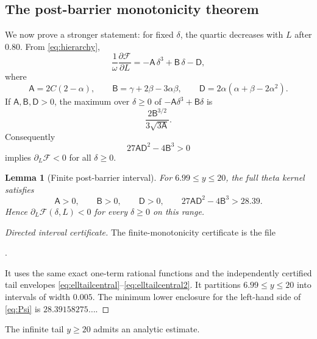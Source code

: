 \documentclass{amsart}
\numberwithin{equation}{section}
\newtheorem{lemma}[theorem]{Lemma}
\theoremstyle{definition}
\theoremstyle{remark}
\newcommand{\Fcal}{\mathcal F}
\begin{document}
\subsection{The post-barrier monotonicity theorem}
We now prove a stronger statement: for fixed $\delta$, the quartic decreases with $L$ after $0.80$.
From \eqref{eq:hierarchy},
\begin{equation}\label{eq:partialF}
 \frac1\omega\frac{\partial\Fcal}{\partial L}
 =-\mathsf A\,\delta^3+\mathsf B\,\delta-\mathsf D,
\end{equation}
where
\begin{equation}\label{eq:ABD}
 \mathsf A=2C(2-\alpha),\qquad
 \mathsf B=\gamma+2\beta-3\alpha\beta,
 \qquad
 \mathsf D=2\alpha(\alpha+\beta-2\alpha^2).
\end{equation}
If $\mathsf A,\mathsf B,\mathsf D>0$, the maximum over $\delta\ge0$ of
$-\mathsf A\delta^3+\mathsf B\delta$ is
\begin{equation}\label{eq:cubicmax}
 \frac{2\mathsf B^{3/2}}{3\sqrt{3\mathsf A}}.
\end{equation}
Consequently
\begin{equation}\label{eq:Psi}
 27\mathsf A\mathsf D^2-4\mathsf B^3>0
\end{equation}
implies $\partial_L\Fcal<0$ for all $\delta\ge0$.

\begin{lemma}[Finite post-barrier interval]\label{lem:finitepost}
For $6.99\le y\le20$, the full theta kernel satisfies
\[
 \mathsf A>0,\qquad \mathsf B>0,\qquad \mathsf D>0,
 \qquad
 27\mathsf A\mathsf D^2-4\mathsf B^3>28.39.
\]
Hence $\partial_L\Fcal(\delta,L)<0$ for every $\delta\ge0$ on this range.
\end{lemma}
\begin{proof}[Directed interval certificate]
The finite-monotonicity certificate is the file\par\smallskip\noindent{}.\par\smallskip\noindent It uses the same exact one-term rational functions and the independently certified tail envelopes \eqref{eq:elltailcentral}--\eqref{eq:elltailcentral2}.  It partitions $6.99\le y\le20$ into intervals of width $0.005$.  The minimum lower enclosure for the left-hand side of \eqref{eq:Psi} is $28.39158275\ldots$.
\end{proof}

The infinite tail $y\ge20$ admits an analytic estimate.
\end{document}
